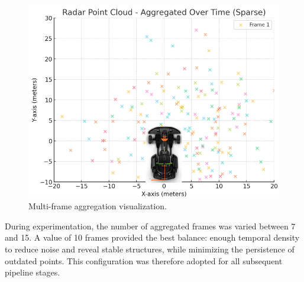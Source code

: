 \begin{figure}[!htbp]
    \centering
    \includegraphics[width=0.5\linewidth]{images/multiframe.png}
    \caption{Multi-frame aggregation visualization.}
    \label{fig:multiframe}
\end{figure}

During experimentation, the number of aggregated frames was varied between 7 and 15.  
A value of 10 frames provided the best balance: enough temporal density to reduce noise and reveal stable structures, while minimizing the persistence of outdated points.  
This configuration was therefore adopted for all subsequent pipeline stages.
